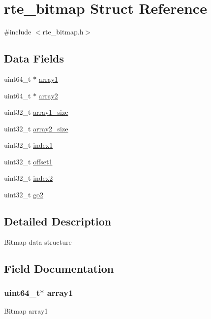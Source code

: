\hypertarget{structrte__bitmap}{}\section{rte\+\_\+bitmap Struct Reference}
\label{structrte__bitmap}


{\ttfamily \#include $<$rte\+\_\+bitmap.\+h$>$}

\subsection*{Data Fields}
\begin{DoxyCompactItemize}
\item 
uint64\+\_\+t $\ast$ \hyperlink{structrte__bitmap_a3de65aee8451256d1a07a943774a46e7}{array1}
\item 
uint64\+\_\+t $\ast$ \hyperlink{structrte__bitmap_a7025f580cb18e7066ae946128df40929}{array2}
\item 
uint32\+\_\+t \hyperlink{structrte__bitmap_a280151fd5ef07a0ba67e352d340658a0}{array1\+\_\+size}
\item 
uint32\+\_\+t \hyperlink{structrte__bitmap_a0c8e04ff3e358b360017573acc3c8ba5}{array2\+\_\+size}
\item 
uint32\+\_\+t \hyperlink{structrte__bitmap_a6db57dc734285937f76eb3b193d4e58e}{index1}
\item 
uint32\+\_\+t \hyperlink{structrte__bitmap_ac9d23fc19363825ef8475d9bd1b1d35e}{offset1}
\item 
uint32\+\_\+t \hyperlink{structrte__bitmap_a1448310cceb53513c1955213ed3918b3}{index2}
\item 
uint32\+\_\+t \hyperlink{structrte__bitmap_a6df8695cbbb48813a048f9616433416a}{go2}
\end{DoxyCompactItemize}


\subsection{Detailed Description}
Bitmap data structure 

\subsection{Field Documentation}
\hypertarget{structrte__bitmap_a3de65aee8451256d1a07a943774a46e7}{}
\subsubsection[{array1}]{\setlength{\rightskip}{0pt plus 5cm}uint64\+\_\+t$\ast$ array1}\label{structrte__bitmap_a3de65aee8451256d1a07a943774a46e7}
Bitmap array1 \hypertarget{structrte__bitmap_a280151fd5ef07a0ba67e352d340658a0}{}
